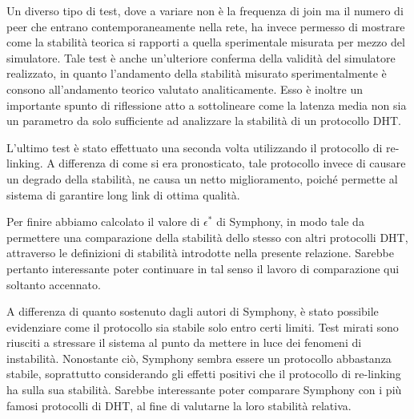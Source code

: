 \documentclass[prodmode,acmtap]{acmlarge}
\begin{document}
Un diverso tipo di test, dove a variare non è la frequenza di join ma il numero di peer che entrano contemporaneamente nella rete, ha invece permesso di mostrare come la stabilità teorica si rapporti a quella sperimentale misurata per mezzo del simulatore. Tale test è anche un'ulteriore conferma della validità del simulatore realizzato, in quanto l'andamento della stabilità misurato sperimentalmente è consono all'andamento teorico valutato analiticamente. Esso è inoltre un importante spunto di riflessione atto a sottolineare come la latenza media non sia un parametro da solo sufficiente ad analizzare la stabilità di un protocollo DHT.

L'ultimo test è stato effettuato una seconda volta utilizzando il protocollo di re-linking. A differenza di come si era pronosticato, tale protocollo invece di causare un degrado della stabilità, ne causa un netto miglioramento, poiché permette al sistema di garantire long link di ottima qualità.

Per finire abbiamo calcolato il valore di $\epsilon^*$ di Symphony, in modo tale da permettere una comparazione della stabilità dello stesso con altri protocolli DHT, attraverso le definizioni di stabilità introdotte nella presente relazione. Sarebbe pertanto interessante poter continuare in tal senso il lavoro di comparazione qui soltanto accennato.

A differenza di quanto sostenuto dagli autori di Symphony, è stato possibile evidenziare come il protocollo sia stabile solo entro certi limiti. Test mirati sono riusciti a stressare il sistema al punto da mettere in luce dei fenomeni di instabilità. Nonostante ciò, Symphony sembra essere un protocollo abbastanza stabile, soprattutto considerando gli effetti positivi che il protocollo di re-linking ha sulla sua stabilità. Sarebbe interessante poter comparare Symphony con i più famosi protocolli di DHT, al fine di valutarne la loro stabilità relativa.





\end{document}
